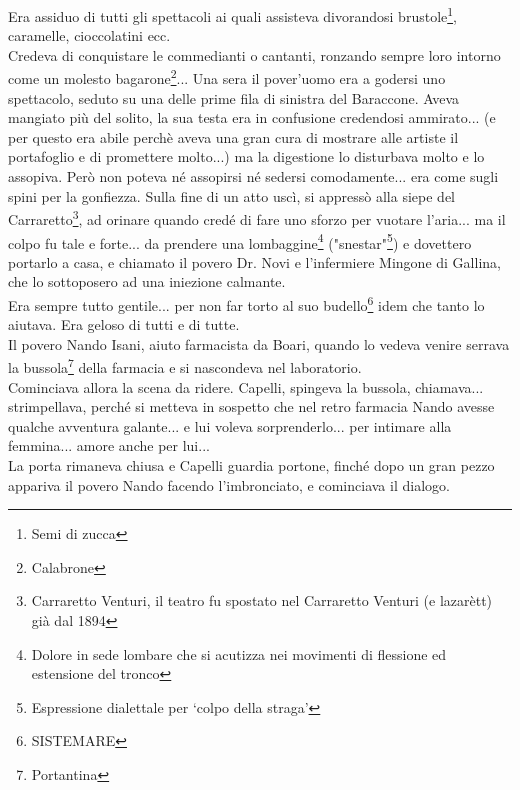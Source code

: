 \documentclass[10pt]{memoir} %
\begin{document}
Era assiduo di tutti gli spettacoli ai quali assisteva divorandosi brustole\footnote{Semi di zucca}, caramelle, cioccolatini ecc.\\
Credeva di conquistare le commedianti o cantanti, ronzando sempre loro intorno come un molesto bagarone\footnote{Calabrone}... Una sera il pover'uomo era a godersi uno spettacolo, seduto su una delle prime fila di sinistra del Baraccone. Aveva mangiato più del solito, la sua testa era in confusione credendosi ammirato... (e per questo era abile perchè aveva una gran cura di mostrare alle artiste il portafoglio e di promettere molto...) ma la digestione lo disturbava molto e lo assopiva. Però non poteva né assopirsi né sedersi comodamente... era come sugli spini per la gonfiezza. Sulla fine di un atto uscì, si appressò alla siepe del Carraretto\footnote{Carraretto Venturi, il teatro fu spostato nel Carraretto Venturi (e lazarètt) già dal 1894}, ad orinare quando credé di fare uno sforzo per vuotare l'aria... ma il colpo fu tale e forte... da prendere una lombaggine\footnote{Dolore in sede lombare che si acutizza nei movimenti di flessione ed estensione del tronco} ("snestar"\footnote{Espressione dialettale per ‘colpo della straga'}) e dovettero portarlo a casa, e chiamato il povero Dr. Novi e l'infermiere Mingone di Gallina, che lo sottoposero ad una iniezione calmante. \\
Era sempre tutto gentile... per non far torto al suo budello\footnote{SISTEMARE} idem che tanto lo aiutava. Era geloso di tutti e di tutte.\\
Il povero Nando Isani, aiuto farmacista da Boari, quando lo vedeva venire serrava la bussola\footnote{Portantina} della farmacia e si nascondeva nel laboratorio.\\
Cominciava allora la scena da ridere. Capelli, spingeva la bussola, chiamava... strimpellava, perché si metteva in sospetto che nel retro farmacia Nando  avesse qualche avventura galante... e lui voleva sorprenderlo... per intimare alla femmina... amore anche per lui... \\
La porta rimaneva chiusa e Capelli guardia portone, finché dopo un gran pezzo appariva il povero Nando  facendo l'imbronciato, e cominciava il dialogo.\\
\end{document}
